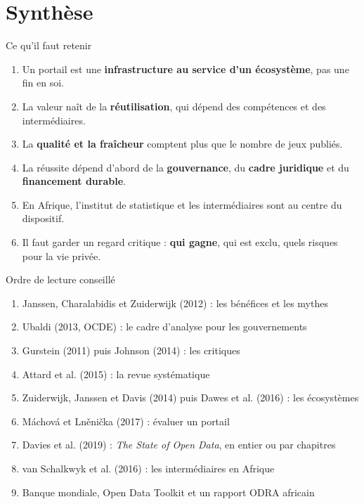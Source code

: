 \documentclass[11pt,aspectratio=169]{beamer}
\begin{document}
\section{Synthèse}

\begin{frame}{Ce qu'il faut retenir}
  \begin{enumerate}
    \item Un portail est une \textbf{infrastructure au service d'un écosystème}, pas une fin en soi.
    \item La valeur naît de la \textbf{réutilisation}, qui dépend des compétences et des intermédiaires.
    \item La \textbf{qualité et la fraîcheur} comptent plus que le nombre de jeux publiés.
    \item La réussite dépend d'abord de la \textbf{gouvernance}, du \textbf{cadre juridique} et du \textbf{financement durable}.
    \item En Afrique, l'institut de statistique et les intermédiaires sont au centre du dispositif.
    \item Il faut garder un regard critique : \textbf{qui gagne}, qui est exclu, quels risques pour la vie privée.
  \end{enumerate}
\end{frame}

\begin{frame}{Ordre de lecture conseillé}
  \begin{enumerate}
    \small
    \item Janssen, Charalabidis et Zuiderwijk (2012) : les bénéfices et les mythes
    \item Ubaldi (2013, OCDE) : le cadre d'analyse pour les gouvernements
    \item Gurstein (2011) puis Johnson (2014) : les critiques
    \item Attard et al. (2015) : la revue systématique
    \item Zuiderwijk, Janssen et Davis (2014) puis Dawes et al. (2016) : les écosystèmes
    \item Máchová et Lněnička (2017) : évaluer un portail
    \item Davies et al. (2019) : \emph{The State of Open Data}, en entier ou par chapitres
    \item van Schalkwyk et al. (2016) : les intermédiaires en Afrique
    \item Banque mondiale, Open Data Toolkit et un rapport ODRA africain
  \end{enumerate}
\end{frame}
\end{document}
